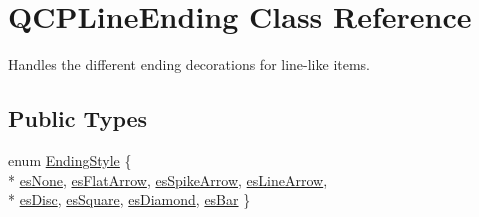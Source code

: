 \hypertarget{classQCPLineEnding}{\section{Q\-C\-P\-Line\-Ending Class Reference}
\label{classQCPLineEnding}
}


Handles the different ending decorations for line-\/like items.  


\subsection*{Public Types}
\begin{DoxyCompactItemize}
\item 
enum \hyperlink{classQCPLineEnding_a5ef16e6876b4b74959c7261d8d4c2cd5}{Ending\-Style} \{ \\*
\hyperlink{classQCPLineEnding_a5ef16e6876b4b74959c7261d8d4c2cd5aca12d500f50cd6871766801bac30fb03}{es\-None}, 
\hyperlink{classQCPLineEnding_a5ef16e6876b4b74959c7261d8d4c2cd5a3d7dcea2f100671727c3417142154f8f}{es\-Flat\-Arrow}, 
\hyperlink{classQCPLineEnding_a5ef16e6876b4b74959c7261d8d4c2cd5ab9964d0d03f812d1e79de15edbeb2cbf}{es\-Spike\-Arrow}, 
\hyperlink{classQCPLineEnding_a5ef16e6876b4b74959c7261d8d4c2cd5a61f78ee8f375fb21cb9d250687bbcbd2}{es\-Line\-Arrow}, 
\\*
\hyperlink{classQCPLineEnding_a5ef16e6876b4b74959c7261d8d4c2cd5ae5a3414916817258bcc6dddd605e8f5c}{es\-Disc}, 
\hyperlink{classQCPLineEnding_a5ef16e6876b4b74959c7261d8d4c2cd5ae1836502fa43d8990bb62b2d493a140a}{es\-Square}, 
\hyperlink{classQCPLineEnding_a5ef16e6876b4b74959c7261d8d4c2cd5a378fe5a8b768411b0bc1765210fe7200}{es\-Diamond}, 
\hyperlink{classQCPLineEnding_a5ef16e6876b4b74959c7261d8d4c2cd5a2cf543bbca332df26d89bf779f50469f}{es\-Bar}
 \}
\end{DoxyCompactItemize}
